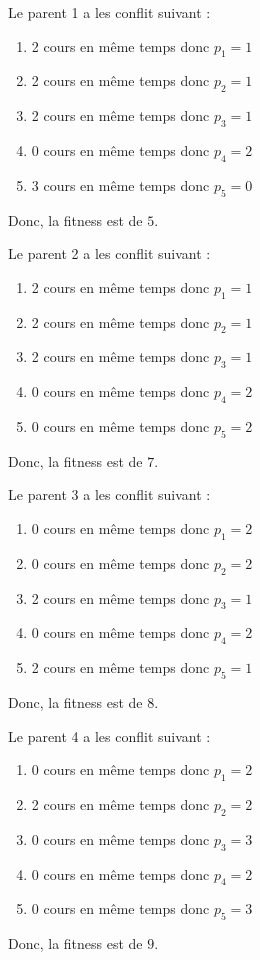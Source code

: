 Le parent 1 a les conflit suivant :
\begin{enumerate}
    \item 2 cours en même temps donc $p_1 = 1$
    \item 2 cours en même temps donc $p_2 = 1$
    \item 2 cours en même temps donc $p_3 = 1$
    \item 0 cours en même temps donc $p_4 = 2$
    \item 3 cours en même temps donc $p_5 = 0$
\end{enumerate}
Donc, la fitness est de $5$.

Le parent 2 a les conflit suivant :
\begin{enumerate}
    \item 2 cours en même temps donc $p_1 = 1$
    \item 2 cours en même temps donc $p_2 = 1$
    \item 2 cours en même temps donc $p_3 = 1$
    \item 0 cours en même temps donc $p_4 = 2$
    \item 0 cours en même temps donc $p_5 = 2$
\end{enumerate}
Donc, la fitness est de $7$.

Le parent 3 a les conflit suivant :
\begin{enumerate}
    \item 0 cours en même temps donc $p_1 = 2$
    \item 0 cours en même temps donc $p_2 = 2$
    \item 2 cours en même temps donc $p_3 = 1$
    \item 0 cours en même temps donc $p_4 = 2$
    \item 2 cours en même temps donc $p_5 = 1$
\end{enumerate}
Donc, la fitness est de $8$.

Le parent 4 a les conflit suivant :
\begin{enumerate}
    \item 0 cours en même temps donc $p_1 = 2$
    \item 2 cours en même temps donc $p_2 = 2$
    \item 0 cours en même temps donc $p_3 = 3$
    \item 0 cours en même temps donc $p_4 = 2$
    \item 0 cours en même temps donc $p_5 = 3$
\end{enumerate}
Donc, la fitness est de $9$.

